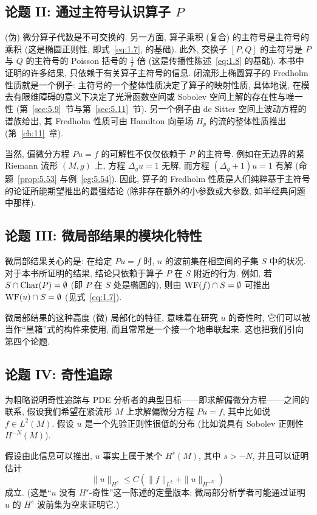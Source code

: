 \subsection*{论题 II: 通过主符号认识算子 $P$}
(伪) 微分算子代数是不可交换的. 另一方面, 算子乘积 (复合) 的主符号是主符号的乘积 (这是椭圆正则性, 即式~\eqref{eq:1.7}, 的基础). 此外, 交换子 $[P, Q]$ 的主符号是 $P$ 与 $Q$ 的主符号的 Poisson 括号的 $\frac{1}{\ii}$ 倍 (这是传播性陈述~\eqref{eq:1.8} 的基础). 本书中证明的许多结果, 只依赖于有关算子主符号的信息. 闭流形上椭圆算子的 Fredholm 性质就是一个例子: 主符号的一个整体性质决定了算子的映射性质, 具体地说, 在模去有限维障碍的意义下决定了光滑函数空间或 Sobolev 空间上解的存在性与唯一性 (第~\ref{sec:5.9}~节与第~\ref{sec:5.11}~节). 另一个例子由 de Sitter 空间上波动方程的谱族给出, 其 Fredholm 性质可由 Hamilton 向量场 $H_p$ 的流的整体性质推出 (第~\ref{ch:11}~章).

当然, 偏微分方程 $P u = f$ 的可解性不仅仅依赖于 $P$ 的主符号. 例如在无边界的紧 Riemann 流形 $(M, g)$ 上, 方程 $\Delta_g u = 1$ 无解, 而方程 $(\Delta_g + 1) u = 1$ 有解 (命题~\ref{prop:5.53} 与例~\ref{eg:5.54}). 因此, 算子的 Fredholm 性质是人们纯粹基于主符号的论证所能期望推出的最强结论 (除非存在额外的小参数或大参数, 如半经典问题中那样).

\subsection*{论题 III: 微局部结果的模块化特性}
微局部结果关心的是: 在给定 $P u = f$ 时, $u$ 的波前集在相空间的子集 $S$ 中的状况. 对于本书所证明的结果, 结论只依赖于算子 $P$ 在 $S$ 附近的行为. 例如, 若 $S \cap \operatorname{Char}(P) = \emptyset$ (即 $P$ 在 $S$ 处是椭圆的), 则由 $\operatorname{WF}(f) \cap S = \emptyset$ 可推出 $\operatorname{WF}(u) \cap S = \emptyset$ (见式~\eqref{eq:1.7}).

微局部结果的这种高度 (微) 局部化的特征, 意味着在研究 $u$ 的奇性时, 它们可以被当作``黑箱''式的构件来使用, 而且常常是一个接一个地串联起来. 这也把我们引向第四个论题.

\subsection*{论题 IV: 奇性追踪}
为粗略说明奇性追踪与 PDE 分析者的典型目标——即求解偏微分方程——之间的联系, 假设我们希望在紧流形 $M$ 上求解偏微分方程 $P u = f$, 其中比如说 $f \in L^2(M)$. 假设 $u$ 是一个先验正则性很低的分布 (比如说具有 Sobolev 正则性 $H^{-N}(M)$).

假设由此信息可以推出, $u$ 事实上属于某个 $H^s(M)$, 其中 $s > -N$, 并且可以证明估计
\begin{equation}\label{eq:1.12}
    \|u\|_{H^s} \le C \left( \|f\|_{L^2} + \|u\|_{H^{-N}} \right)
\end{equation}
成立. (这是``$u$ 没有 $H^s$-奇性''这一陈述的定量版本; 微局部分析学者可能通过证明 $u$ 的 $H^s$ 波前集为空来证明它.)

